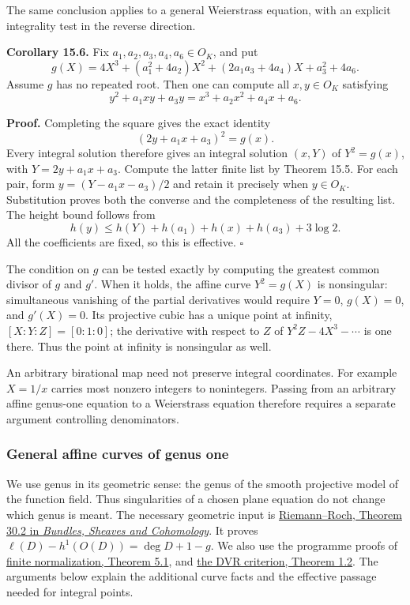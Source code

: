 \documentclass[
  11pt,
  a4paper,
]{article}
\begin{document}
The same conclusion applies to a general Weierstrass equation, with an
explicit integrality test in the reverse direction.

\textbf{Corollary 15.6.} Fix \(a_1,a_2,a_3,a_4,a_6\in O_K\), and put \[
g(X)=4X^3+(a_1^2+4a_2)X^2
             +(2a_1a_3+4a_4)X+a_3^2+4a_6.
\] Assume \(g\) has no repeated root. Then one can compute all
\(x,y\in O_K\) satisfying \[
y^2+a_1xy+a_3y=x^3+a_2x^2+a_4x+a_6.
\]

\textbf{Proof.} Completing the square gives the exact identity \[
(2y+a_1x+a_3)^2=g(x).
\] Every integral solution therefore gives an integral solution
\((x,Y)\) of \(Y^2=g(x)\), with \(Y=2y+a_1x+a_3\). Compute the latter
finite list by Theorem 15.5. For each pair, form \(y=(Y-a_1x-a_3)/2\)
and retain it precisely when \(y\in O_K\). Substitution proves both the
converse and the completeness of the resulting list. The height bound
follows from \[
h(y)\le h(Y)+h(a_1)+h(x)+h(a_3)+3\log2.
\] All the coefficients are fixed, so this is effective. \(\square\)

The condition on \(g\) can be tested exactly by computing the greatest
common divisor of \(g\) and \(g'\). When it holds, the affine curve
\(Y^2=g(X)\) is nonsingular: simultaneous vanishing of the partial
derivatives would require \(Y=0\), \(g(X)=0\), and \(g'(X)=0\). Its
projective cubic has a unique point at infinity, \([X:Y:Z]=[0:1:0]\);
the derivative with respect to \(Z\) of \(Y^2Z-4X^3-\cdots\) is one
there. Thus the point at infinity is nonsingular as well.

An arbitrary birational map need not preserve integral coordinates. For
example \(X=1/x\) carries most nonzero integers to nonintegers. Passing
from an arbitrary affine genus-one equation to a Weierstrass equation
therefore requires a separate argument controlling denominators.

\subsubsection{General affine curves of genus
one}\label{general-affine-curves-of-genus-one}

We use genus in its geometric sense: the genus of the smooth projective
model of the function field. Thus singularities of a chosen plane
equation do not change which genus is meant. The necessary geometric
input is
\href{https://kokunoyumeto.github.io/program-matematika-indonesia/en/courses/D100/reader/bgk.html\#br-bgk-2019-l30-thm-02}{Riemann--Roch,
Theorem 30.2 in \emph{Bundles, Sheaves and Cohomology}}. It proves
\(\ell(D)-h^1(O(D))=\deg D+1-g\). We also use the programme proofs of
\href{https://kokunoyumeto.github.io/open-math-courses-public/courses/AG-MO/normalization.html}{finite normalization, Theorem
5.1}, and
\href{https://kokunoyumeto.github.io/open-math-courses-public/courses/AG-CA/discrete-valuation-rings-normal-rings-and-serres-criterion.html}{the
DVR criterion, Theorem 1.2}. The arguments below explain the additional
curve facts and the effective passage needed for integral points.
\end{document}
